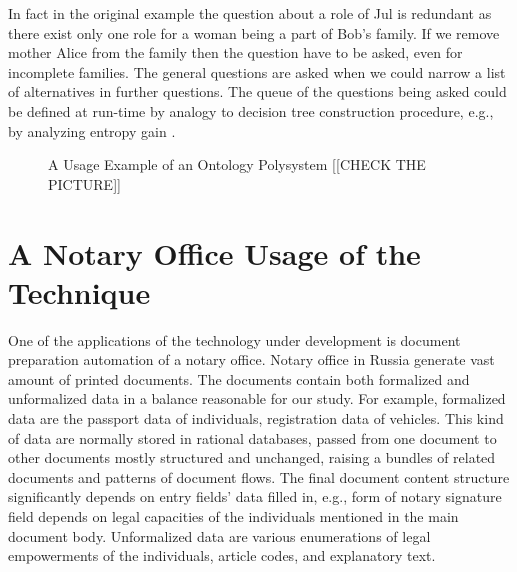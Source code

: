 \documentclass[conference]{IEEEtran}
\begin{document}
In fact in the original example the question about a role of
Jul is redundant as there exist only one role for a woman being a part
of Bob's family.  If we remove mother Alice from the family then the
question have to be asked, even for incomplete families.  The general
questions are asked when we could narrow a list of alternatives in
further questions.  The queue of the questions being asked could be
defined at run-time by analogy to decision tree construction
procedure, e.g., by analyzing entropy gain \cite{dectrees}.

\begin{figure}
\centering\footnotesize\sf
\def\svgwidth{0.9\linewidth}

\caption{A Usage Example of an Ontology Polysystem [[CHECK THE PICTURE]]}
\label{OPSA}
\end{figure}








\section{A Notary Office Usage of the Technique}

One of the applications of the technology under development is
document preparation automation of a notary office.  Notary office in
Russia generate vast amount of printed documents.  The documents
contain both formalized and unformalized data in a balance reasonable
for our study.  For example, formalized data are the passport data of
individuals, registration data of vehicles.  This kind of data are
normally stored in rational databases, passed from one document to
other documents mostly structured and unchanged, raising a bundles of
related documents and patterns of document flows.  The final document
content structure significantly depends on entry fields’ data filled
in, e.g., form of notary signature field depends on legal capacities of the
individuals mentioned in the main document body.
Unformalized data are various enumerations of legal empowerments of
the individuals, article codes, and explanatory text.
\end{document}
